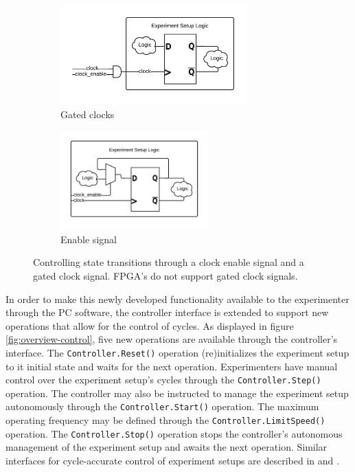 \documentclass[openright]{template/uva-bachelor-thesis}
\begin{document}

\begin{figure}[h]
    \centering
    \begin{subfigure}[t]{0.5\textwidth}
        \centering
        \includegraphics[height=1.5in]{img/clock-manipulation-gated}
        \caption{Gated clocks}
        \label{fig:clock-manipulation-gated}
    \end{subfigure}%
    \begin{subfigure}[t]{0.5\textwidth}
        \centering
        \includegraphics[height=1.5in]{img/clock-manipulation-enable}
        \caption{Enable signal}
        \label{fig:clock-manipulation-enable}
    \end{subfigure}%
    \caption{Controlling state transitions through a clock enable signal and a gated clock signal. FPGA's do not support gated clock signals.}
    \label{fig:clock-manipulation}
\end{figure}

In order to make this newly developed functionality available to the experimenter through the PC software, the controller interface is extended to support new operations that allow for the control of cycles. As displayed in figure \ref{fig:overview-control}, five new operations are available through the controller's interface. The \texttt{Controller.Reset()} operation (re)initializes the experiment setup to it initial state and waits for the next operation. Experimenters have manual control over the experiment setup's cycles through the \texttt{Controller.Step()} operation. The controller may also be instructed to manage the experiment setup autonomously through the \texttt{Controller.Start()} operation. The maximum operating frequency may be defined through the \texttt{Controller.LimitSpeed()} operation. The \texttt{Controller.Stop()} operation stops the controller's autonomous management of the experiment setup and awaits the next operation. Similar interfaces for cycle-accurate control of experiment setups are described in \cite{holland2003harnessing} and \cite{bulic2013fpga}.
\end{document}
